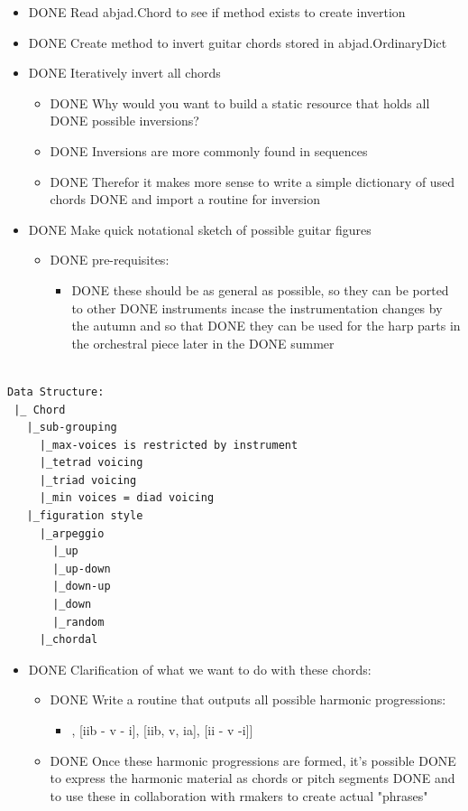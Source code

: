 \documentclass[11pt]{article}
\begin{document}
\begin{itemize}
\item DONE Read abjad.Chord to see if method exists to create invertion
\item DONE Create method to invert guitar chords stored in abjad.OrdinaryDict
\item DONE Iteratively invert all chords
\begin{itemize}
\item DONE Why would you want to build a static resource that holds all
DONE possible inversions?
\item DONE Inversions are more commonly found in sequences
\item DONE Therefor it makes more sense to write a simple dictionary of used
chords
DONE and import a routine for inversion
\end{itemize}
\item DONE Make quick notational sketch of possible guitar figures
\begin{itemize}
\item DONE pre-requisites:
\begin{itemize}
\item DONE these should be as general as possible, so they can be ported to other
DONE instruments incase the instrumentation changes by the autumn and so that
DONE they can be used for the harp parts in the orchestral piece later in the
DONE summer
\end{itemize}
\end{itemize}
\end{itemize}

\begin{verbatim}

Data Structure:
 |_ Chord
   |_sub-grouping
     |_max-voices is restricted by instrument
     |_tetrad voicing
     |_triad voicing
     |_min voices = diad voicing
   |_figuration style
     |_arpeggio
       |_up
       |_up-down
       |_down-up
       |_down
       |_random
     |_chordal

\end{verbatim}

\begin{itemize}
\item DONE Clarification of what we want to do with these chords:
\begin{itemize}
\item DONE Write a routine that outputs all possible harmonic progressions:
\begin{itemize}
\item\relax [[ii - v - i], [iib - v - i], [iib, v, ia], [ii - v -i]]
\end{itemize}
\item DONE Once these harmonic progressions are formed, it's possible
DONE to express the harmonic material as chords or pitch segments
DONE and to use these in collaboration with rmakers to create actual
"phrases"
\end{itemize}
\end{itemize}
\end{document}
